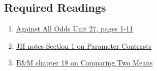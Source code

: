 \documentclass[letterpaper,9pt,twoside,printwatermark=false]{pinp}
\begin{document}
\subsection{Required Readings}\label{required-readings}

\begin{enumerate}
\item \href{https://www.learner.org/courses/againstallodds/pdfs/AgainstAllOdds_StudentGuide_Unit27.pdf#page=1}{Against All Odds Unit 27, pages 1-11}
\item \href{https://www.dropbox.com/s/1l3i59rw1qsnmsz/EPIB607introToRegression.pdf?dl=0}{JH notes Section 1 on Parameter Contrasts}
\item \href{https://www.dropbox.com/s/pix61mnrt7j4c7t/Ch18Comparing2Means.pdf?dl=0}{B\&M chapter 18 on Comparing Two Means}
\end{enumerate}





\end{document}
